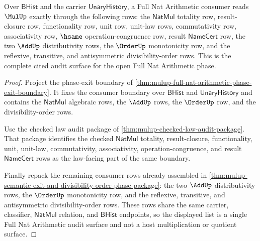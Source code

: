 \begin{theorem}
\label{thm:mulup-full-nat-arithmetic-audit-surface}
Over $\mathsf{BHist}$ and the carrier $\mathsf{UnaryHistory}$, a Full Nat
Arithmetic consumer reads $\MulUp$ exactly through the following rows: the
$\mathsf{NatMul}$ totality row, result-closure row, functionality row, unit
row, unit-law rows, commutativity row, associativity row,
$\hsame$ operation-congruence row, result $\mathsf{NameCert}$ row, the two
$\AddUp$ distributivity rows, the $\OrderUp$ monotonicity row, and the
reflexive, transitive, and antisymmetric divisibility-order rows. This is the
complete cited audit surface for the open Full Nat Arithmetic phase.
\end{theorem}
\begin{proof}
Project the phase-exit boundary of
\autoref{thm:mulup-full-nat-arithmetic-phase-exit-boundary}. It fixes the
consumer boundary over $\mathsf{BHist}$ and $\mathsf{UnaryHistory}$ and
contains the $\mathsf{NatMul}$ algebraic rows, the $\AddUp$ rows, the
$\OrderUp$ row, and the divisibility-order rows.

Use the checked law audit package of
\autoref{thm:mulup-checked-law-audit-package}. That package identifies the
checked $\mathsf{NatMul}$ totality, result-closure, functionality, unit,
unit-law, commutativity, associativity, operation-congruence, and result
$\mathsf{NameCert}$ rows as the law-facing part of the same boundary.

Finally repack the remaining consumer rows already assembled in
\autoref{thm:mulup-semantic-exit-and-divisibility-order-phase-package}: the
two $\AddUp$ distributivity rows, the $\OrderUp$ monotonicity row, and the
reflexive, transitive, and antisymmetric divisibility-order rows. These rows
share the same carrier, classifier, $\mathsf{NatMul}$ relation, and
$\mathsf{BHist}$ endpoints, so the displayed list is a single Full Nat
Arithmetic audit surface and not a host multiplication or quotient surface.
\end{proof}

